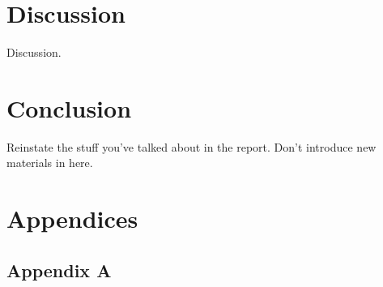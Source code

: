 \documentclass[a4paper, 11pt]{article}
\begin{document}
\section{Discussion}\label{sec:dis}
    Discussion.

\section{Conclusion}\label{sec:conc}
    Reinstate the stuff you've talked about in the report. Don't introduce new materials in here.

\pagebreak

\renewcommand{\bibname}{References}
\renewcommand{\bibsection}{\section{\bibname}}
\renewcommand{\cite}{\citep}

\pagebreak

\section{Appendices}
    \subsection{Appendix A}
\end{document}
